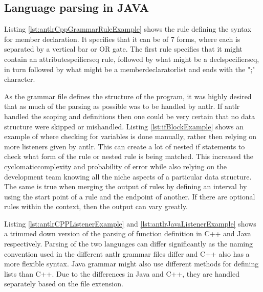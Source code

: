 \subsection{Language parsing in JAVA} \label{subsection:parsingJava}


Listing \ref{lst:antlrCppGrammarRuleExample} shows the rule defining the syntax for member declaration. 
It specifies that it can be of 7 forms, where each is separated by a vertical bar or OR gate. The first rule specifies that it might contain an attributespeifierseq rule, followed by what might be a declspecifierseq, in turn followed by what might be a memberdeclaratorlist and ends with the ";" character. 


As the grammar file defines the structure of the program, it was highly desired that as much of the parsing as possible was to be handled by \gls{antlr}. If \gls{antlr} handled the scoping and definitions then one could be very certain that no data structure were skipped or mishandled. Listing \ref{lst:ifBlockExample} shows an example of where checking for variables is done manually, rather then relying on more listeners given by \gls{antlr}. This can create a lot of nested if statements to check what form of the rule or nested rule is being matched. This increased the \Gls{cyclomaticcomplexity} and probability of error while also relying on the development team knowing all the niche aspects of a particular data structure. The same is true when merging the output of rules by defining an interval by using the start point of a rule and the endpoint of another. If there are optional rules within the context, then the output can vary greatly. 





Listing \ref{lst:antlrCPPListenerExample} and \ref{lst:antlrJavaListenerExample} shows a trimmed down version of the parsing of function definition in C++ and Java respectively. Parsing of the two languages can differ significantly as the naming convention used in the different \gls{antlr} grammar files differ and C++ also has a more flexible syntax. Java grammar might also use different methods for defining lists than C++. 
Due to the differences in Java and C++, they are handled separately based on the file extension. 

